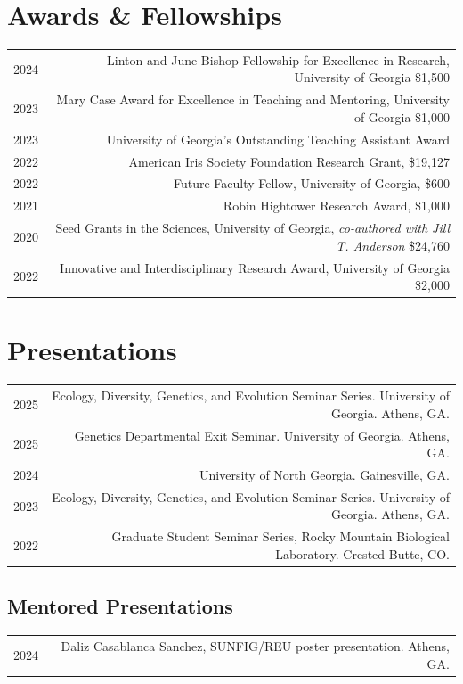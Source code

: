 \documentclass[letterpaper, 11pt]{article}
\begin{document}
\section*{Awards \& Fellowships}
\begin{tabular}{DR}
2024 &Linton and June Bishop Fellowship for Excellence in Research, University of Georgia \$1,500 \\
2023 &Mary Case Award for Excellence in Teaching and Mentoring, University of Georgia \$1,000 \\
2023  &University of Georgia's Outstanding Teaching Assistant Award \\
2022 &American Iris Society Foundation Research Grant, \$19,127 \\
2022  & Future Faculty Fellow, University of Georgia, \$600\\
2021 &Robin Hightower Research Award, \$1,000 \\
2020  &Seed Grants in the Sciences, University of Georgia, \textit{co-authored with Jill T. Anderson} \$24,760 \\
2022 &Innovative and Interdisciplinary Research Award, University of Georgia \$2,000 \\

\end{tabular}

\section*{Presentations}

\begin{tabular}{DR}

2025 &Ecology, Diversity, Genetics, and Evolution Seminar Series. University of Georgia. Athens, GA. \\
2025 & Genetics Departmental Exit Seminar. University of Georgia. Athens, GA. \\
2024 & University of North Georgia. Gainesville, GA. \\ 
2023 &Ecology, Diversity, Genetics, and Evolution Seminar Series. University of Georgia. Athens, GA. \\
2022 & Graduate Student Seminar Series, Rocky Mountain Biological Laboratory. Crested Butte, CO. \\
\end{tabular}
\subsection*{Mentored Presentations}
\begin{tabular} {DR}
2024 &Daliz Casablanca Sanchez, SUNFIG/REU poster presentation. Athens, GA. \\
\end{tabular}
\end{document}
